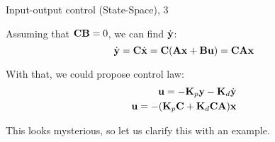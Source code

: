 \documentclass{beamer}
\begin{document}
\begin{frame}{Input-output control (State-Space), 3}
	\begin{flushleft}
		
		Assuming that $\mathbf{C}\mathbf{B} = 0$, we can find $\dot{\mathbf{y}}$:
		\begin{equation}
			\dot{\mathbf{y}} = \mathbf{C}\dot{\mathbf{x}} = \mathbf{C}(\mathbf{A}\mathbf{x} + \mathbf{B}\mathbf{u}) = \mathbf{C}\mathbf{A}\mathbf{x}
		\end{equation}		
		
		With that, we could propose control law:
		\begin{align}
			\mathbf{u} = -\mathbf{K}_p \mathbf{y} - \mathbf{K}_d \dot{\mathbf{y}} \\
			\mathbf{u} = -(\mathbf{K}_p \mathbf{C} + \mathbf{K}_d \mathbf{C}\mathbf{A})\mathbf{x}
		\end{align}
	
		This looks mysterious, so let us clarify this with an example.				
		
	\end{flushleft}
\end{frame}
\end{document}
